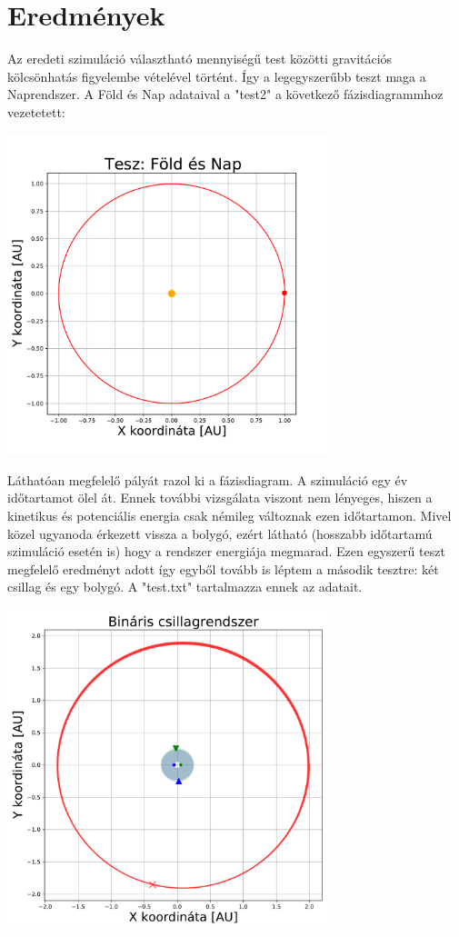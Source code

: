 \section{Eredmények}
Az eredeti szimuláció választható mennyiségű test közötti gravitációs kölcsönhatás figyelembe vételével történt. Így a legegyszerűbb teszt maga a Naprendszer. A Föld és Nap adataival a "test2" a következő fázisdiagrammhoz vezetetett:
\begin{center}
    \includegraphics[width=0.7\textwidth]{pics/test1.pdf}
\end{center}
Láthatóan megfelelő pályát razol ki a fázisdiagram. A szimuláció egy év időtartamot ölel át. Ennek további vizsgálata viszont nem lényeges, hiszen a kinetikus és potenciális energia csak némileg változnak ezen időtartamon. Mivel közel ugyanoda érkezett vissza a bolygó, ezért látható (hosszabb időtartamú szimuláció esetén is) hogy a rendszer energiája megmarad.
Ezen egyszerű teszt megfelelő eredményt adott így egyből tovább is léptem a második tesztre: két csillag és egy bolygó. A "test.txt" tartalmazza ennek az adatait.
\begin{center}
    \includegraphics[width=0.7\textwidth]{pics/test2_10.pdf}
    \label{fig::binary}
\end{center}
